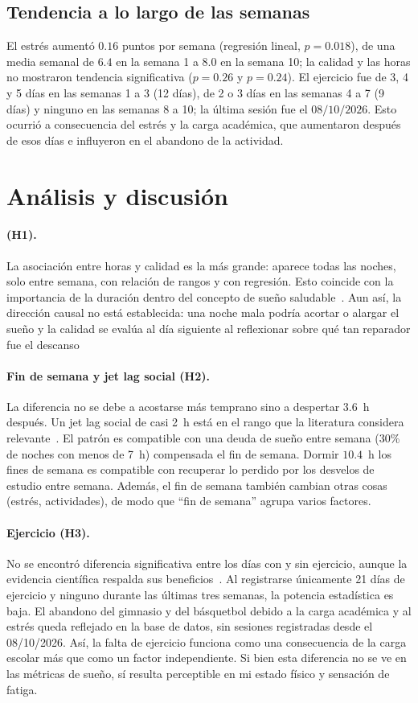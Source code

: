 \documentclass[conference]{IEEEtran}
\begin{document}
\subsection{Tendencia a lo largo de las semanas}
El estrés aumentó $0.16$ puntos por semana (regresión lineal, $p=0.018$), de una media semanal de $6.4$ en la semana 1 a $8.0$ en la semana 10; la calidad y las horas no mostraron tendencia significativa ($p=0.26$ y $p=0.24$). El ejercicio fue de 3, 4 y 5 días en las semanas 1 a 3 (12 días), de 2 o 3 días en las semanas 4 a 7 (9 días) y ninguno en las semanas 8 a 10; la última sesión fue el $08/10/2026$. Esto ocurrió a consecuencia del estrés y la carga académica, que aumentaron después de esos días e influyeron en el abandono de la actividad.


\section{Análisis y discusión}

\paragraph{(H1).} La asociación entre horas y calidad es la más grande: aparece todas las noches, solo entre semana, con relación de rangos y con regresión. Esto coincide con la importancia de la duración dentro del concepto de sueño saludable~\cite{ref1}. Aun así, la dirección causal no está establecida: una noche mala podría acortar o alargar el sueño y la calidad se evalúa al día siguiente al reflexionar sobre qué tan reparador fue el descanso

\paragraph{Fin de semana y jet lag social (H2).} La diferencia no se debe a acostarse más temprano sino a despertar $3.6$~h después. Un jet lag social de casi 2~h está en el rango que la literatura considera relevante~\cite{ref8,ref9}. El patrón es compatible con una deuda de sueño entre semana (30\% de noches con menos de 7~h) compensada el fin de semana. Dormir $10.4$~h los fines de semana es compatible con recuperar lo perdido por los desvelos de estudio entre semana. Además, el fin de semana también cambian otras cosas (estrés, actividades), de modo que ``fin de semana'' agrupa varios factores.

\paragraph{Ejercicio (H3).} No se encontró diferencia significativa entre los días con y sin ejercicio, aunque la evidencia científica respalda sus beneficios~\cite{ref16}. Al registrarse únicamente 21 días de ejercicio y ninguno durante las últimas tres semanas, la potencia estadística es baja. El abandono del gimnasio y del básquetbol debido a la carga académica y al estrés queda reflejado en la base de datos, sin sesiones registradas desde el 08/10/2026. Así, la falta de ejercicio funciona como una consecuencia de la carga escolar más que como un factor independiente. Si bien esta diferencia no se ve en las métricas de sueño, sí resulta perceptible en mi estado físico y sensación de fatiga.
\end{document}
